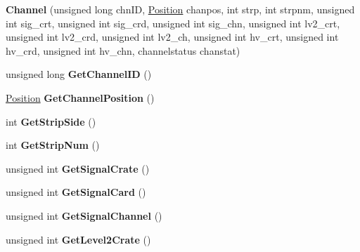 \begin{DoxyCompactItemize}
\item 
\hypertarget{classChannel_ae1078b5c2230dd8fcba2bbd4e8100c57}{
{\bfseries Channel} (unsigned long chnID, \hyperlink{classPosition}{Position} chanpos, int strp, int strpnm, unsigned int sig\_\-crt, unsigned int sig\_\-crd, unsigned int sig\_\-chn, unsigned int lv2\_\-crt, unsigned int lv2\_\-crd, unsigned int lv2\_\-ch, unsigned int hv\_\-crt, unsigned int hv\_\-crd, unsigned int hv\_\-chn, channelstatus chanstat)}
\label{classChannel_ae1078b5c2230dd8fcba2bbd4e8100c57}

\item 
\hypertarget{classChannel_a135981325d6cd967c06b27eef9f0abb0}{
unsigned long {\bfseries GetChannelID} ()}
\label{classChannel_a135981325d6cd967c06b27eef9f0abb0}

\item 
\hypertarget{classChannel_a20f0f3be320a2bb029169a4dbe93cf90}{
\hyperlink{classPosition}{Position} {\bfseries GetChannelPosition} ()}
\label{classChannel_a20f0f3be320a2bb029169a4dbe93cf90}

\item 
\hypertarget{classChannel_aaf73be7554bca0d37886ead17e7dd378}{
int {\bfseries GetStripSide} ()}
\label{classChannel_aaf73be7554bca0d37886ead17e7dd378}

\item 
\hypertarget{classChannel_a8e11f287e50dd85bc16ec31cab5b19f5}{
int {\bfseries GetStripNum} ()}
\label{classChannel_a8e11f287e50dd85bc16ec31cab5b19f5}

\item 
\hypertarget{classChannel_a75f4e595dfd853b4705aaab4b4dd7e5d}{
unsigned int {\bfseries GetSignalCrate} ()}
\label{classChannel_a75f4e595dfd853b4705aaab4b4dd7e5d}

\item 
\hypertarget{classChannel_a3fe69d8eb34bbb71101faa490eff401c}{
unsigned int {\bfseries GetSignalCard} ()}
\label{classChannel_a3fe69d8eb34bbb71101faa490eff401c}

\item 
\hypertarget{classChannel_a0adb3da425cdc8571e3f2070339d1b45}{
unsigned int {\bfseries GetSignalChannel} ()}
\label{classChannel_a0adb3da425cdc8571e3f2070339d1b45}

\item 
\hypertarget{classChannel_aed336de8cbfe7b004a966b08998f10a1}{
unsigned int {\bfseries GetLevel2Crate} ()}
\label{classChannel_aed336de8cbfe7b004a966b08998f10a1}


\end{DoxyCompactItemize}
